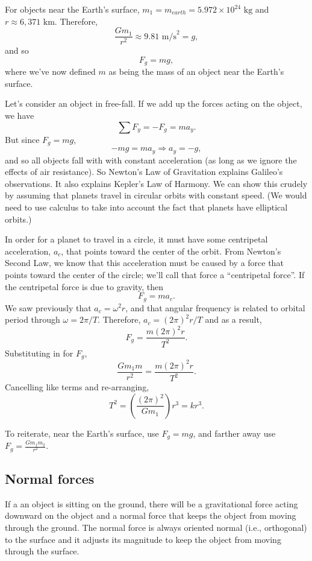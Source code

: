 For objects near the Earth's surface, $m_1=m_{earth}=5.972\times 10^{24}\mbox{ kg}$ and $r\approx 6,371\mbox{ km}$. Therefore,
$$\frac{Gm_1}{r^2}\approx 9.81\mbox{ m/s}^2=g,$$
and so
$$F_g=mg,$$
where we've now defined $m$ as being the mass of an object near the Earth's surface.

Let's consider an object in free-fall. If we add up the forces acting on the object, we have
$$\sum F_y=-F_g=ma_y.$$
But since $F_g=mg$,
$$-mg=ma_y\Rightarrow \boxed{a_y=-g},$$
and so all objects fall with with constant acceleration (as long as we ignore the effects of air resistance). So Newton's Law of Gravitation explains Galileo's observations. It also explains Kepler's Law of Harmony. We can show this crudely by assuming that planets travel in circular orbits with constant speed. (We would need to use calculus to take into account the fact that planets have elliptical orbits.)

In order for a planet to travel in a circle, it must have some centripetal acceleration, $a_c$, that points toward the center of the orbit. From Newton's Second Law, we know that this acceleration must be caused by a force that points toward the center of the circle; we'll call that force a ``centripetal force''. If the centripetal force is due to gravity, then
$$F_g=ma_c.$$
We saw previously that $a_c=\omega^2 r$, and that angular frequency is related to orbital period through $\omega=2\pi/T$. Therefore, $a_c=(2\pi)^2r/T$ and as a result,
$$F_g=\frac{m(2\pi)^2r}{T^2}.$$
Substituting in for $F_g$,
$$\frac{Gm_1m}{r^2}=\frac{m(2\pi)^2r}{T^2}.$$
Cancelling like terms and re-arranging,
$$\boxed{T^2=\left(\frac{(2\pi)^2}{Gm_1}\right)r^3=kr^3}.$$

To reiterate, near the Earth's surface, use $F_g=mg$, and farther away use $F_g=\frac{Gm_1m_2}{r^2}$.

\subsection{Normal forces}
If a an object is sitting on the ground, there will be a gravitational force acting downward on the object and a normal force that keeps the object from moving through the ground. The normal force is always oriented normal (i.e., orthogonal) to the surface and it adjusts its magnitude to keep the object from moving through the surface.

\vspace{5cm}

